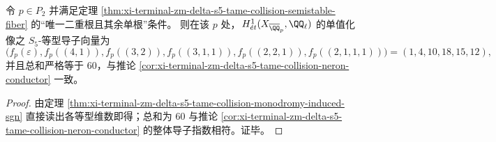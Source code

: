 \begin{corollary}[温和碰撞素数处的等型导子向量]\label{cor:xi-terminal-zm-delta-s5-tame-collision-isotypic-conductor-vector}
令 \(p\in P_2\) 并满足定理 \ref{thm:xi-terminal-zm-delta-s5-tame-collision-semistable-fiber} 的“唯一二重根且其余单根”条件。
则在该 \(p\) 处，\(\,H^1_{\acute e t}(X_{\overline{\QQ}_p},\QQ_\ell)\) 的单值化像之 \(S_5\)-等型导子向量为
\[
\bigl(f_p(\varepsilon),f_p((4,1)),f_p((3,2)),f_p((3,1,1)),f_p((2,2,1)),f_p((2,1,1,1))\bigr)
=(1,4,10,18,15,12),
\]
并且总和严格等于 \(60\)，与推论 \ref{cor:xi-terminal-zm-delta-s5-tame-collision-neron-conductor} 一致。
\end{corollary}
\begin{proof}
由定理 \ref{thm:xi-terminal-zm-delta-s5-tame-collision-monodromy-induced-sgn} 直接读出各等型维数即得；总和为 \(60\) 与推论 \ref{cor:xi-terminal-zm-delta-s5-tame-collision-neron-conductor} 的整体导子指数相符。证毕。
\end{proof}

